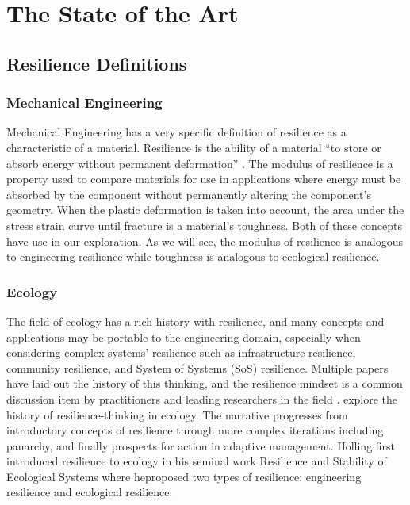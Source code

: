 
\renewcommand{\thechapter}{1}

\chapter{The State of the Art}

\section{Resilience Definitions}


\subsection{Mechanical Engineering}
Mechanical Engineering has a very specific definition of resilience as
a characteristic of a material. Resilience is the ability of a
material ``to store or absorb energy without permanent deformation''
\cite{Popov1964}.
The modulus of resilience is a property used to compare
materials for use in applications where energy must be absorbed by the
component without permanently altering the component's geometry. When
the plastic deformation is taken into account, the area under the
stress strain curve until fracture is a material's toughness. Both of
these concepts have use in our exploration. As we will see, the
modulus of resilience is analogous to engineering resilience
\cite{Holling1973a}
while toughness is analogous to ecological resilience.

\subsection{Ecology}
The field of ecology has a rich history with resilience, and many
concepts and applications may be portable to the engineering domain,
especially when considering complex systems' resilience such as
infrastructure resilience, community resilience, and System of Systems
(SoS) resilience. Multiple papers have laid out the history of this
thinking, and the resilience mindset is a common discussion item by
practitioners and leading researchers in the field \cite{Curtin2014}.
explore the history of resilience-thinking in ecology. The
narrative progresses from introductory concepts of resilience through
more complex iterations including panarchy, and finally prospects for
action in adaptive management. Holling first introduced resilience to ecology in his
seminal work Resilience and Stability of Ecological Systems
\cite{Holling1973a} where heproposed two types of resilience: engineering
resilience and ecological resilience.

